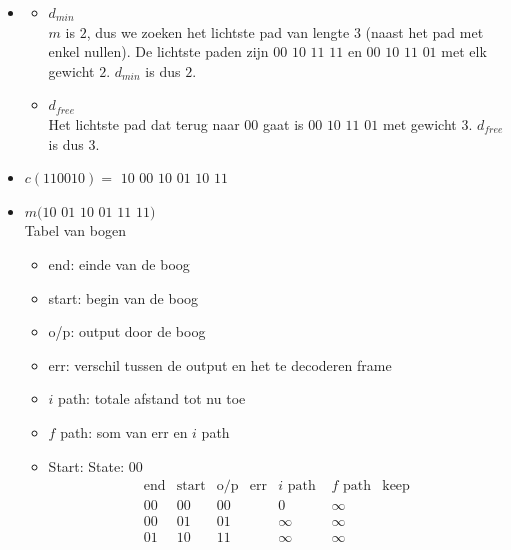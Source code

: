 \documentclass[main.tex]{subfiles}
\begin{document}
\begin{itemize}
\begin{figure}[H]
  \end{figure}
\item 
  \begin{itemize}
  \item $d_{min}$\\
    $m$ is $2$, dus we zoeken het lichtste pad van lengte $3$ (naast het pad met enkel nullen).
    De lichtste paden zijn $00$ $10$ $11$ $11$ en $00$ $10$ $11$ $01$ met elk gewicht $2$.
    $d_{min}$ is dus $2$.
  \item $d_{free}$\\
    Het lichtste pad dat terug naar $00$ gaat is $00$ $10$ $11$ $01$ met gewicht $3$.
    $d_{free}$ is dus $3$.
  \end{itemize}
\item $c(110010) = $ $10$ $00$ $10$ $01$ $10$ $11$
\item $m(10$ $01$ $10$ $01$ $11$ $11)$\\
  Tabel van bogen
  \begin{itemize}
  \item end: einde van de boog
  \item start: begin van de boog
  \item o/p: output door de boog
  \item err: verschil tussen de output en het te decoderen frame
  \item $i$ path: totale afstand tot nu toe
  \item $f$ path: som van err en $i$ path
  \end{itemize}
  \begin{itemize}
  \item Start: State: $00$
    \[
    \begin{array}{ccccccc}
      \hline
      \text{end} & \text{start} & \text{o/p} & \text{err} & i \text{ path } & f \text{ path} & \text{keep}\\
      \hline
      00 & 00 & 00 & & 0 & \infty & \\
      00 & 01 & 01 & & \infty & \infty & \\
      01 & 10 & 11 & & \infty & \infty & \\

\end{array}\]
\end{itemize}
\end{itemize}
\end{document}
